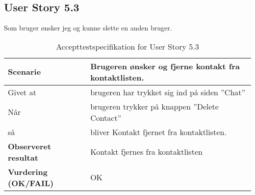 \subsection{User Story 5.3}
Som bruger ønsker jeg og kunne slette en anden bruger.

\begin{table}[H]
	\centering
	\caption{Accepttestspecifikation for User Story 5.3 }
	\begin{tabular}{p{8cm}|p{8cm}}
		\hline
		\textbf{Scenarie} & Brugeren ønsker og fjerne kontakt fra kontaktlisten.\\[10px]
		\hline
        Givet at & brugeren har trykket sig ind på siden ''Chat''\\
        \hline
        Når & brugeren trykker på knappen ''Delete Contact''\\
        \hline
        så & bliver Kontakt fjernet fra kontaktlisten.\\
		\hline
		\rowcolor{white}
		\textbf{Observeret resultat} & Kontakt fjernes fra kontaktlisten\\
		\hline
		\textbf{Vurdering (OK/FAIL)} & OK\\
		\hline
	\end{tabular}
\end{table}